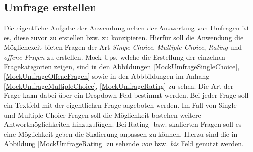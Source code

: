 \subsection{Umfrage erstellen}
\label{ssec:konzept:client:umfrage_erstellen}

Die eigentliche Aufgabe der Anwendung neben der Auswertung von Umfragen ist es, diese zuvor zu erstellen bzw. zu konzipieren.
Hierfür soll die Anwendung die Möglichekeit bieten Fragen der Art \emph{Single Choice}, \emph{Multiple Choice}, \emph{Rating} und \emph{offene Fragen} zu erstellen.
Mock-Ups, welche die Erstellung der einzelnen Fragekategorien zeigen, sind in den Abbildungen \ref{MockUmfrageSingleChoice}, \ref{MockUmfrageOffeneFragen} sowie in den Abbbildungen im Anhang \ref{MockUmfrageMultipleChoice}, \ref{MockUmfrageRating} zu sehen.
Die Art der Frage kann dabei über ein Dropdown-Feld bestimmt werden.
Bei jeder Frage soll ein Textfeld mit der eigentlichen Frage angeboten werden.
Im Fall von Single- und Multiple-Choice-Fragen soll die Möglichkeit bestehen weitere Antwortmöglichkeiten hinzuzufügen.
Bei Rating- bzw. skalierten Fragen soll es eine Möglichkeit geben die Skalierung anpassen zu können.
Hierzu sind die in  Abbildung  \ref{MockUmfrageRating} zu sehende \emph{von} bzw. \emph{bis} Feld genutzt werden.





